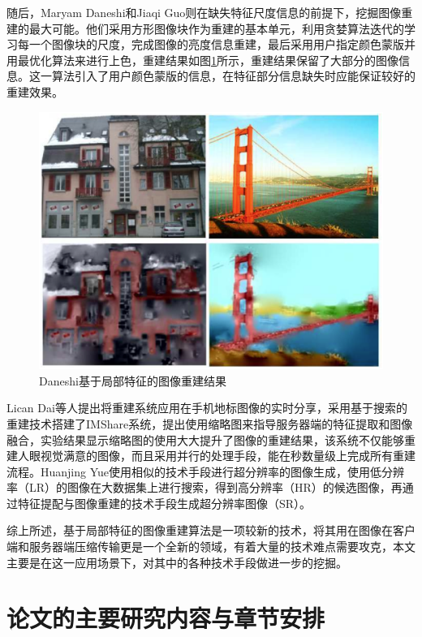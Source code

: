 随后，Maryam Daneshi和Jiaqi Guo\cite{Daneshi:2011wi}则在缺失特征尺度信息的前提下，挖掘图像重建的最大可能。他们采用方形图像块作为重建的基本单元，利用贪婪算法迭代的学习每一个图像块的尺度，完成图像的亮度信息重建，最后采用用户指定颜色蒙版并用最优化算法来进行上色，重建结果如图\ref{fig:Daneshi_res}所示，重建结果保留了大部分的图像信息。这一算法引入了用户颜色蒙版的信息，在特征部分信息缺失时应能保证较好的重建效果。
\begin{figure}
\centering\includegraphics[width=15cm]{imgs/ch1/Daneshi_res}
\caption{Daneshi基于局部特征的图像重建结果}
\label{fig:Daneshi_res}
\end{figure}

Lican Dai等人提出将重建系统应用在手机地标图像的实时分享\cite{Dai:2012vn}，采用基于搜索的重建技术搭建了IMShare系统，提出使用缩略图来指导服务器端的特征提取和图像融合，实验结果显示缩略图的使用大大提升了图像的重建结果，该系统不仅能够重建人眼视觉满意的图像，而且采用并行的处理手段，能在秒数量级上完成所有重建流程。Huanjing Yue使用相似的技术手段进行超分辨率的图像生成，使用低分辨率（LR）的图像在大数据集上进行搜索，得到高分辨率（HR）的候选图像，再通过特征提配与图像重建的技术手段生成超分辨率图像（SR）。

综上所述，基于局部特征的图像重建算法是一项较新的技术，将其用在图像在客户端和服务器端压缩传输更是一个全新的领域，有着大量的技术难点需要攻克，本文主要是在这一应用场景下，对其中的各种技术手段做进一步的挖掘。

\section{论文的主要研究内容与章节安排}
